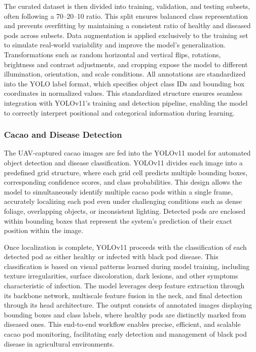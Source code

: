The curated dataset is then divided into training, validation, and testing subsets, often following a 70–20–10 ratio. This split ensures balanced class representation and prevents overfitting by maintaining a consistent ratio of healthy and diseased pods across subsets. Data augmentation is applied exclusively to the training set to simulate real-world variability and improve the model’s generalization. Transformations such as random horizontal and vertical flips, rotations, brightness and contrast adjustments, and cropping expose the model to different illumination, orientation, and scale conditions. All annotations are standardized into the YOLO label format, which specifies object class IDs and bounding box coordinates in normalized values. This standardized structure ensures seamless integration with YOLOv11’s training and detection pipeline, enabling the model to correctly interpret positional and categorical information during learning.


\subsubsection*{Cacao and Disease Detection}

The UAV-captured cacao images are fed into the YOLOv11 model for automated object detection and disease classification. YOLOv11 divides each image into a predefined grid structure, where each grid cell predicts multiple bounding boxes, corresponding confidence scores, and class probabilities. This design allows the model to simultaneously identify multiple cacao pods within a single frame, accurately localizing each pod even under challenging conditions such as dense foliage, overlapping objects, or inconsistent lighting. Detected pods are enclosed within bounding boxes that represent the system’s prediction of their exact position within the image.

Once localization is complete, YOLOv11 proceeds with the classification of each detected pod as either healthy or infected with black pod disease. This classification is based on visual patterns learned during model training, including texture irregularities, surface discoloration, dark lesions, and other symptoms characteristic of infection. The model leverages deep feature extraction through its backbone network, multiscale feature fusion in the neck, and final detection through its head architecture. The output consists of annotated images displaying bounding boxes and class labels, where healthy pods are distinctly marked from diseased ones. This end-to-end workflow enables precise, efficient, and scalable cacao pod monitoring, facilitating early detection and management of black pod disease in agricultural environments.


